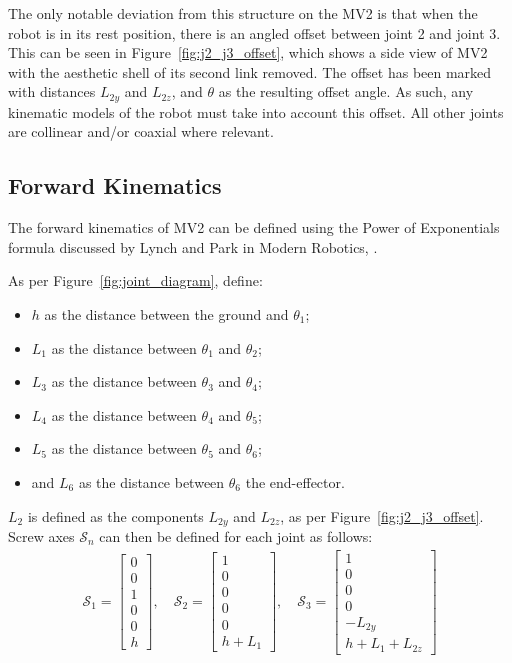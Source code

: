 \documentclass[a4paper,11pt]{article}
\begin{document}
The only notable deviation from this structure on the MV2 is that when the robot is in its rest position, there is an angled offset between joint 2 and joint 3. This can be seen in Figure~\ref{fig:j2_j3_offset}, which shows a side view of MV2 with the aesthetic shell of its second link removed. The offset has been marked with distances $L_{2y}$ and $L_{2z}$, and $\theta$ as the resulting offset angle. As such, any kinematic models of the robot must take into account this offset. All other joints are collinear and/or coaxial where relevant.

\subsection{Forward Kinematics}

The forward kinematics of MV2 can be defined using the Power of Exponentials formula discussed by Lynch and Park in Modern Robotics, \cite{modernrobotics}.

As per Figure~\ref{fig:joint_diagram}, define:
\begin{itemize}
    \item $h$ as the distance between the ground and $\theta_{1}$;
    \item $L_{1}$ as the distance between $\theta_{1}$ and $\theta_{2}$;
    \item $L_{3}$ as the distance between $\theta_{3}$ and $\theta_{4}$;
    \item $L_{4}$ as the distance between $\theta_{4}$ and $\theta_{5}$;
    \item $L_{5}$ as the distance between $\theta_{5}$ and $\theta_{6}$;
    \item and $L_{6}$ as the distance between $\theta_{6}$ the end-effector.
\end{itemize}
$L_{2}$ is defined as the components $L_{2y}$ and $L_{2z}$, as per Figure~\ref{fig:j2_j3_offset}. Screw axes $\mathcal{S}_{n}$ can then be defined for each joint as follows:
\begin{align*}
    \mathcal{S}_{1} = \begin{bmatrix}
    0 \\ 0 \\ 1 \\ 0 \\ 0 \\ h    
    \end{bmatrix}, \quad
    \mathcal{S}_{2} = \begin{bmatrix}
    1 \\ 0 \\ 0 \\ 0 \\ 0 \\ h + L_{1}   
    \end{bmatrix}, \quad
    \mathcal{S}_{3} = \begin{bmatrix}
    1 \\ 0 \\ 0 \\ 0 \\ -L_{2y} \\ h + L_{1} + L_{2z}   
    \end{bmatrix}
\end{align*}
\end{document}
